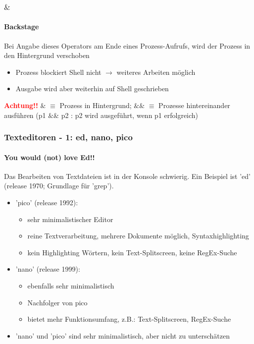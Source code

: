 \documentclass[12pt,utf8, handout]{beamer}
\begin{document}
\begin{frame}
\frametitle{$\&$}
\framesubtitle{Backstage}
Bei Angabe dieses Operators am Ende eines Prozess-Aufrufs, wird der Prozess in den Hintergrund verschoben
\begin{itemize}[<+->]
	\item Prozess blockiert Shell nicht $\to$ weiteres Arbeiten möglich
	\item Ausgabe wird aber weiterhin auf Shell geschrieben
\end{itemize}
\textbf{\textcolor{red}{Achtung!!}} $\&$ $\equiv$ Prozess in Hintergrund; $\&\&$ $\equiv$ Prozesse hintereinander ausführen (p1 $\&\&$ p2 : p2 wird ausgeführt, wenn p1 erfolgreich)
\end{frame}

\begin{frame}
\frametitle{Texteditoren - 1: ed, nano, pico}
\framesubtitle{\textcolor{ownDarkOr}{You would (not) love Ed!!}}
Das Bearbeiten von Textdateien ist in der Konsole schwierig. Ein Beispiel ist 'ed' (release 1970; Grundlage für 'grep').
\begin{itemize}
	\item 'pico' (release 1992):
	\begin{itemize}[<+->]
		\item {\scriptsize sehr minimalistischer Editor}
		\item {\scriptsize reine Textverarbeitung, mehrere Dokumente möglich, Syntaxhighlighting}
		\item {\scriptsize kein Highlighting Wörtern, kein Text-Splitscreen, keine RegEx-Suche}
	\end{itemize}
	\item 'nano' (release 1999):
	\begin{itemize}[<+->]
		\item {\scriptsize ebenfalls sehr minimalistisch}
		\item {\scriptsize Nachfolger von pico}
		\item {\scriptsize bietet mehr Funktionsumfang, z.B.: Text-Splitscreen, RegEx-Suche}
	\end{itemize}
	\item 'nano' und 'pico' sind sehr minimalistisch, aber nicht zu unterschätzen
\end{itemize}
\end{frame}
\end{document}
